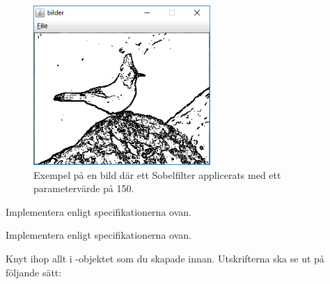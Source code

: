 \begin{figure}[H]
\begin{center}
\includegraphics[width=0.6\textwidth]{../img/w13-assignment-imageprocessing/sobeljay.png}
\caption { Exempel på en bild där ett Sobelfilter applicerats med ett parametervärde på 150.}
\label{fig:imageprocessing:sobelfilter:sobel}
\end{center}
\end{figure}


\Task Implementera  enligt specifikationerna ovan.

\Task Implementera  enligt specifikationerna ovan.

\Task Knyt ihop allt i -objektet som du skapade innan. Utskrifterna ska se ut på följande sätt:\newline

